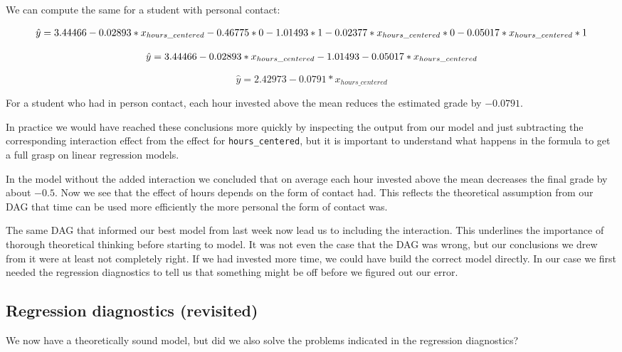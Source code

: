 \documentclass[
]{book}
\begin{document}
We can compute the same for a student with personal contact:

\[\hat{y} = 3.44466 -0.02893 * x_{hours\_centered} -\\
0.46775 * 0 - 1.01493 * 1  -\\
0.02377 * x_{hours\_centered} * 0 -\\
0.05017 * x_{hours\_centered} * 1\]

\[\hat{y} = 3.44466 -0.02893 *x_{hours\_centered} -\\
1.01493 -\\
0.05017 * x_{hours\_centered}\]

\[\hat{y} = 2.42973 -0.0791 *x_{hours\_centered}\]

For a student who had in person contact, each hour invested above the mean reduces the estimated grade by \(-0.0791\).

In practice we would have reached these conclusions more quickly by inspecting the output from our model and just subtracting the corresponding interaction effect from the effect for \texttt{hours\_centered}, but it is important to understand what happens in the formula to get a full grasp on linear regression models.

In the model without the added interaction we concluded that on average each hour invested above the mean decreases the final grade by about \(-0.5\). Now we see that the effect of hours depends on the form of contact had. This reflects the theoretical assumption from our DAG that time can be used more efficiently the more personal the form of contact was.

The same DAG that informed our best model from last week now lead us to including the interaction. This underlines the importance of thorough theoretical thinking before starting to model. It was not even the case that the DAG was wrong, but our conclusions we drew from it were at least not completely right. If we had invested more time, we could have build the correct model directly. In our case we first needed the regression diagnostics to tell us that something might be off before we figured out our error.

\hypertarget{regression-diagnostics-revisited}{%
\subsection{Regression diagnostics (revisited)}\label{regression-diagnostics-revisited}}

We now have a theoretically sound model, but did we also solve the problems indicated in the regression diagnostics?
\end{document}
